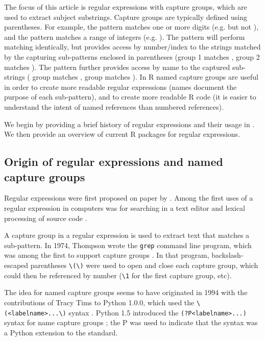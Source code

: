 The focus of this article is regular expressions with capture groups,
which are used to extract subject substrings. Capture groups are
typically defined using parentheses. For example, the pattern
\code{[0-9]+} matches one or more digits (e.g.  but not
), and the pattern \code{[0-9]+-[0-9]+} matches a range of
integers (e.g. ). The pattern \code{([0-9]+)-([0-9]+)} will
perform matching identically, but provides access by number/index to
the strings matched by the capturing sub-patterns enclosed in
parentheses (group 1 matches , group 2 matches ). The
pattern  further provides access
by name to the captured sub-strings ( group matches
,  group matches ). In R named capture
groups are useful in order to create more readable regular expressions
(names document the purpose of each sub-pattern), and to create more
readable R code (it is easier to understand the intent of named references than
numbered references).

We begin by providing a brief history of regular
expressions and their usage in \R. We then provide an overview of
current R packages for regular expressions.

\subsection{Origin of regular expressions and named capture groups}

Regular expressions were first proposed on paper
by \citet{Kleene56}. Among the first uses of a regular expression in
computers was for searching in a text editor \citep{Thompson68} and
lexical processing of source code \citep{Johnson68}. 

A capture group in a regular expression is used to extract text that
matches a sub-pattern. In 1974, Thompson wrote the \texttt{grep}
command line program, which was among the first to support capture
groups \citep{Friedl2002}. In that program, backslash-escaped
parentheses \verb|\(\)| were used to open and close each capture
group, which could then be referenced by number (\verb|\1| for the
first capture group, etc).

The idea for named capture groups seems to have originated in 1994
with the contributions of Tracy Tims to Python 1.0.0, which used the
\verb|\(<labelname>...\)| syntax
\citep{Python-1.5.2-Misc-HISTORY}. Python 1.5 introduced the
\verb|(?P<labelname>...)| syntax for name capture groups
\citep{python-1.5-Doc-libre.tex}; the P was used to indicate that the
syntax was a Python extension to the standard.

